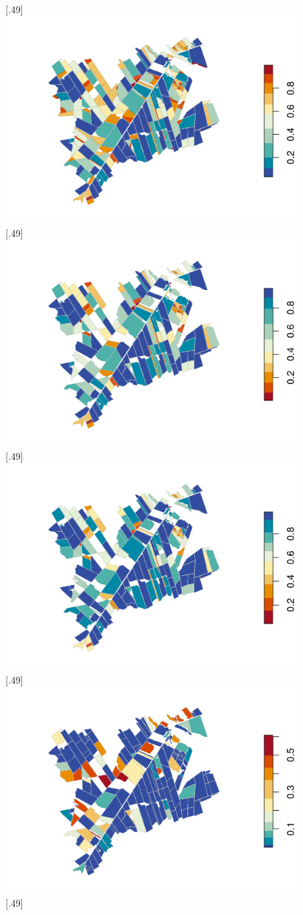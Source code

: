 \begin{figure}[!ht]
    \subcaptionbox{\label{fig:fig6a}}[.49\textwidth]
    {\includegraphics[trim=60 10 0 10, clip, width=.49\textwidth]{fig6a.png}}
    \subcaptionbox{\label{fig:fig6b}}[.49\textwidth]
    {\includegraphics[trim=60 10 0 10, clip, width=.49\textwidth]{fig6b.png}}
    \\
    \subcaptionbox{\label{fig:fig6c}}[.49\textwidth]
    {\includegraphics[trim=60 10 0 10, clip, width=.49\textwidth]{fig6c.png}}
    \subcaptionbox{\label{fig:fig6d}}[.49\textwidth]
    {\includegraphics[trim=60 10 0 10, clip, width=.49\textwidth]{fig6d.png}}
    \\
    \subcaptionbox{\label{fig:fig6e}}[.49\textwidth]

\end{figure}
